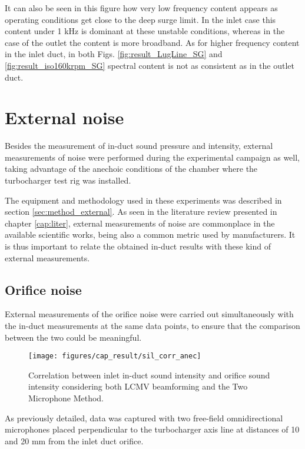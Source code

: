 It can also be seen in this figure how very low frequency content appears as operating conditions get close to the deep surge limit. In the inlet case this content under 1 kHz is dominant at these unstable conditions, whereas in the case of the outlet the content is more broadband. As for higher frequency content in the inlet duct, in both Figs. \ref{fig:result_LugLine_SG} and \ref{fig:result_iso160krpm_SG} spectral content is not as consistent as in the outlet duct.

\section{External noise}
\label{sec:external_results}

Besides the measurement of in-duct sound pressure and intensity, external measurements of noise were performed during the experimental campaign as well, taking advantage of the anechoic conditions of the chamber where the turbocharger test rig was installed. 

The equipment and methodology used in these experiments was described in section \ref{sec:method_external}. As seen in the literature review presented in chapter \ref{cap:liter}, external measurements of noise are commonplace in the available scientific works, being also a common metric used by manufacturers. It is thus important to relate the obtained in-duct results with these kind of external measurements.

\subsection{Orifice noise}

External measurements of the orifice noise were carried out simultaneously with the in-duct measurements at the same data points, to ensure that the comparison between the two could be meaningful. 

\begin{figure}[b!]
\centering
\texttt{[image: figures/cap\_result/sil\_corr\_anec]}
\caption{Correlation between inlet in-duct sound intensity and orifice sound intensity considering both LCMV beamforming and the Two Microphone Method.}
\label{fig:sil_corr_aneic}
\end{figure}

As previously detailed, data was captured with two free-field omnidirectional microphones placed perpendicular to the turbocharger axis line at distances of 10 and 20 mm from the inlet duct orifice.

